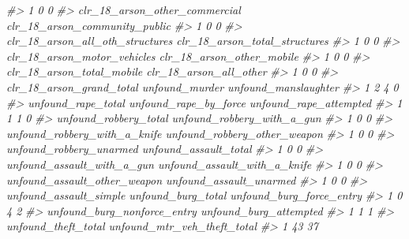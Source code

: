 \documentclass[
]{krantz}
\makeatletter
\newenvironment{Shaded}{\begin{snugshade}}{\end{snugshade}}
\newcommand{\CommentTok}[1]{\textcolor[rgb]{0.37,0.37,0.37}{\textit{#1}}}
\newenvironment{kframe}{%
\medskip{}
\setlength{\fboxsep}{.8em}
 \def\at@end@of@kframe{}%
 \ifinner\ifhmode%
  \def\at@end@of@kframe{\end{minipage}}%
  \begin{minipage}{\columnwidth}%
 \fi\fi%
 \def\FrameCommand##1{\hskip\@totalleftmargin \hskip-\fboxsep
 \colorbox{shadecolor}{##1}\hskip-\fboxsep
     \hskip-\linewidth \hskip-\@totalleftmargin \hskip\columnwidth}%
 \MakeFramed {\advance\hsize-\width
   \@totalleftmargin\z@ \linewidth\hsize
   \@setminipage}}%
 {\par\unskip\endMakeFramed%
 \at@end@of@kframe}
\renewenvironment{Shaded}{\begin{kframe}}{\end{kframe}}
\makeatother
\begin{document}
\begin{Shaded}
\begin{Highlighting}[]
\CommentTok{\#\textgreater{} 1                    0                       0}
\CommentTok{\#\textgreater{}   clr\_18\_arson\_other\_commercial clr\_18\_arson\_community\_public}
\CommentTok{\#\textgreater{} 1                             0                             0}
\CommentTok{\#\textgreater{}   clr\_18\_arson\_all\_oth\_structures clr\_18\_arson\_total\_structures}
\CommentTok{\#\textgreater{} 1                               0                             0}
\CommentTok{\#\textgreater{}   clr\_18\_arson\_motor\_vehicles clr\_18\_arson\_other\_mobile}
\CommentTok{\#\textgreater{} 1                           0                         0}
\CommentTok{\#\textgreater{}   clr\_18\_arson\_total\_mobile clr\_18\_arson\_all\_other}
\CommentTok{\#\textgreater{} 1                         0                      0}
\CommentTok{\#\textgreater{}   clr\_18\_arson\_grand\_total unfound\_murder unfound\_manslaughter}
\CommentTok{\#\textgreater{} 1                        2              4                    0}
\CommentTok{\#\textgreater{}   unfound\_rape\_total unfound\_rape\_by\_force unfound\_rape\_attempted}
\CommentTok{\#\textgreater{} 1                  1                     1                      0}
\CommentTok{\#\textgreater{}   unfound\_robbery\_total unfound\_robbery\_with\_a\_gun}
\CommentTok{\#\textgreater{} 1                     0                          0}
\CommentTok{\#\textgreater{}   unfound\_robbery\_with\_a\_knife unfound\_robbery\_other\_weapon}
\CommentTok{\#\textgreater{} 1                            0                            0}
\CommentTok{\#\textgreater{}   unfound\_robbery\_unarmed unfound\_assault\_total}
\CommentTok{\#\textgreater{} 1                       0                     0}
\CommentTok{\#\textgreater{}   unfound\_assault\_with\_a\_gun unfound\_assault\_with\_a\_knife}
\CommentTok{\#\textgreater{} 1                          0                            0}
\CommentTok{\#\textgreater{}   unfound\_assault\_other\_weapon unfound\_assault\_unarmed}
\CommentTok{\#\textgreater{} 1                            0                       0}
\CommentTok{\#\textgreater{}   unfound\_assault\_simple unfound\_burg\_total unfound\_burg\_force\_entry}
\CommentTok{\#\textgreater{} 1                      0                  4                        2}
\CommentTok{\#\textgreater{}   unfound\_burg\_nonforce\_entry unfound\_burg\_attempted}
\CommentTok{\#\textgreater{} 1                           1                      1}
\CommentTok{\#\textgreater{}   unfound\_theft\_total unfound\_mtr\_veh\_theft\_total}
\CommentTok{\#\textgreater{} 1                  43                          37}

\end{Highlighting}
\end{Shaded}
\end{document}
